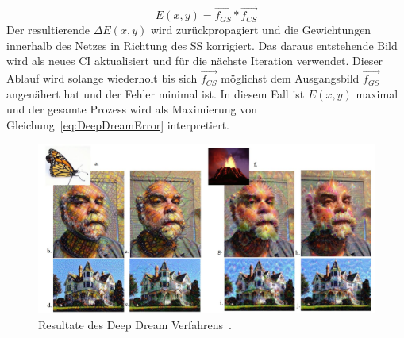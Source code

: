 \documentclass[times, 11pt,twocolumn]{article}
\begin{document}
\footnotesize
\begin{equation}
E(x,y)= \vec{f_{GS}}* \vec{f_{CS}}
\label{eq:DeepDreamError}
\end{equation}
\small
Der resultierende  $\Delta E(x,y)$ wird zurückpropagiert und die Gewichtungen innerhalb des Netzes in Richtung des SS korrigiert. Das daraus entstehende Bild wird als neues CI aktualisiert und für die nächste Iteration verwendet.
Dieser Ablauf wird solange wiederholt bis sich $\vec{f_{CS}}$  möglichst dem Ausgangsbild $\vec{f_{GS}}$ angenähert hat und der Fehler minimal ist. In diesem Fall ist $E(x,y)$ maximal und der gesamte Prozess wird als Maximierung von Gleichung~\ref{eq:DeepDreamError} interpretiert.\\

\begin{figure}
	\flushleft
	\includegraphics[width=\columnwidth]{Bilder/DeepDreamResults.JPG}
	\caption{Resultate des Deep Dream Verfahrens~\cite{McCaigDG16}.}
	\label{fig:DeepDreamResults}
\end{figure}
\end{document}
